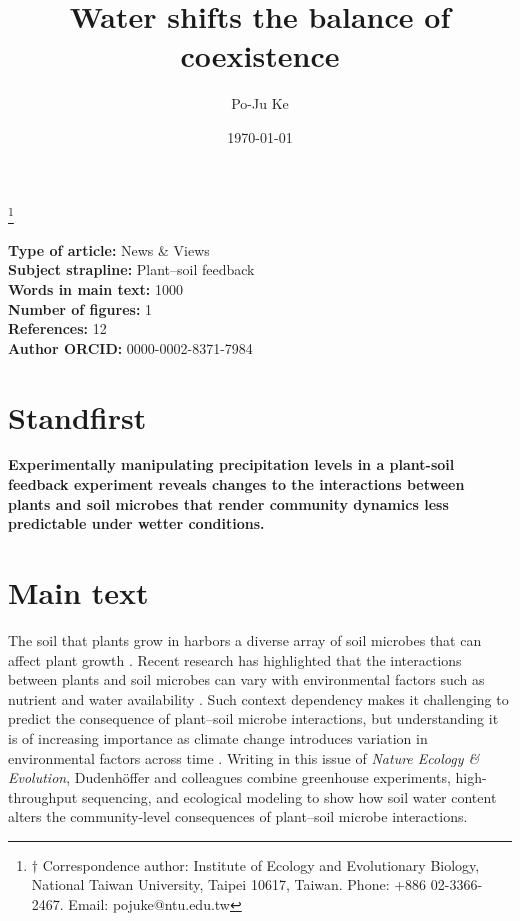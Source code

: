 \documentclass[hidelinks,letterpaper, 11pt]{article}
\newcommand\blfootnote[1]{%
	\begingroup
	\renewcommand\thefootnote{}\footnote{#1}%
	\addtocounter{footnote}{-1}%
	\endgroup
}
\begin{document}
	
	
	
\doublespacing
\title{Water shifts the balance of coexistence}
\author[1, $\dagger$]{Po-Ju Ke}
\date{\today}
\maketitle
\blfootnote{$\dagger$ Correspondence author: Institute of Ecology and Evolutionary Biology, National Taiwan University, Taipei 10617, Taiwan. Phone: +886 02-3366-2467. Email: pojuke@ntu.edu.tw}
	
\onehalfspacing
\noindent \textbf{Type of article:} News \& Views\\
\noindent \textbf{Subject strapline:} Plant--soil feedback\\
\noindent \textbf{Words in main text:} 1000\\
\noindent \textbf{Number of figures:} 1\\
\noindent \textbf{References:} 12\\
\noindent \textbf{Author ORCID:} 0000-0002-8371-7984\\
	

\linenumbers
\doublespacing


\newpage
\section*{Standfirst}
\textbf{Experimentally manipulating precipitation levels in a plant-soil feedback experiment reveals changes to the interactions between plants and soil microbes that render community dynamics less predictable under wetter conditions.}
\bigskip



\section*{Main text}
The soil that plants grow in harbors a diverse array of soil microbes that can affect plant growth \citep{vanderPutten2013}. 
Recent research has highlighted that the interactions between plants and soil microbes can vary with environmental factors such as nutrient and water availability \citep{Smith2017, DeLong2019}.
Such context dependency makes it challenging to predict the consequence of plant--soil microbe interactions, but understanding it is of increasing importance as climate change introduces variation in environmental factors across time \citep{Pugnaire2019}.
Writing in this issue of \textit{Nature Ecology \& Evolution}, Dudenh{\"o}ffer and colleagues \citep{Dudenhoffer2022} combine greenhouse experiments, high-throughput sequencing, and ecological modeling to show how soil water content alters the community-level consequences of plant--soil microbe interactions. 
\medskip
\end{document}
